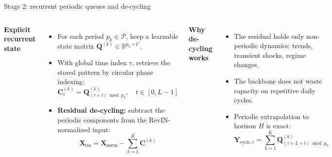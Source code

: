\documentclass[aspectratio=169]{beamer}
\begin{document}
\begin{frame}{Stage 2: recurrent periodic queues and de-cycling}
\small
\begin{columns}[T]
\textbf{Explicit recurrent state}\par\vspace{0.2em}
\begin{itemize}
  \setlength{\itemsep}{0.4em}
  \item For each period $p_k \in \mathcal{P}$, keep a learnable state matrix $\mathbf{Q}^{(k)} \in \mathbb{R}^{p_k \times C}$.
  \item With global time index $\tau$, retrieve the stored pattern by circular phase indexing:
  \[ \mathbf{C}^{(k)}_t = \mathbf{Q}^{(k)}_{(\tau + t) \bmod p_k}, \quad t \in [0, L-1] \]
  \item \textbf{Residual de-cycling:} subtract the periodic components from the RevIN-normalized input:
  \[ \mathbf{X}_{\text{res}} = \mathbf{X}_{\text{norm}} - \sum_{k=1}^{K} \mathbf{C}^{(k)} \]
\end{itemize}
\textbf{Why de-cycling works}\par\vspace{0.2em}
\begin{itemize}
  \setlength{\itemsep}{0.4em}
  \item The residual holds only non-periodic dynamics: trends, transient shocks, regime changes.
  \item The backbone does not waste capacity on repetitive daily cycles.
  \item Periodic extrapolation to horizon $H$ is exact:
  \[ \mathbf{Y}_{\text{cycle},t} = \sum_{k=1}^{K} \mathbf{Q}^{(k)}_{(\tau + L + t) \bmod p_k} \]
\end{itemize}
\end{columns}
\end{frame}
\end{document}
